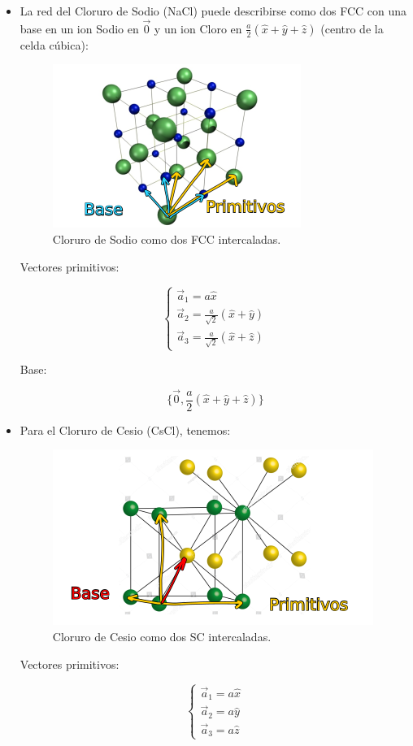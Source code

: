 \documentclass[a4paper]{article}
\begin{document}
\begin{itemize}
\item La red del Cloruro de Sodio (NaCl) puede describirse como dos FCC con una base en un ion Sodio en $\vec{0}$ y un ion Cloro en $\frac{a}{2}(\hat{x} + \hat{y} + \hat{z})$ (centro de la celda c\'ubica):

\begin{figure}[H]
  \centering
  \includegraphics[width=0.5\linewidth,height=0.3\linewidth]{nacl.png}
  \caption{Cloruro de Sodio como dos FCC intercaladas.}
  \label{fig:nacl}
\end{figure}


Vectores primitivos:

$$\begin{cases}
\vec{a}_{1} = a\hat{x} \\
\vec{a}_{2} = \frac{a}{\sqrt{2}}(\hat{x} + \hat{y}) \\
\vec{a}_{3} = \frac{a}{\sqrt{2}}(\hat{x} + \hat{z})
\end{cases}$$

Base:

$$\{\vec{0}, \frac{a}{2}(\hat{x} + \hat{y} + \hat{z}) \}$$

\item Para el Cloruro de Cesio (CsCl), tenemos:

\begin{figure}[H]
  \centering
  \includegraphics[width=0.5\linewidth,height=0.3\linewidth]{cscl.png}
  \caption{Cloruro de Cesio como dos SC intercaladas.}
  \label{fig:cscl}
\end{figure}

Vectores primitivos:

$$\begin{cases}
\vec{a}_{1} = a\hat{x} \\
\vec{a}_{2} = a\hat{y} \\
\vec{a}_{3} = a\hat{z}
\end{cases}$$


\end{itemize}
\end{document}
